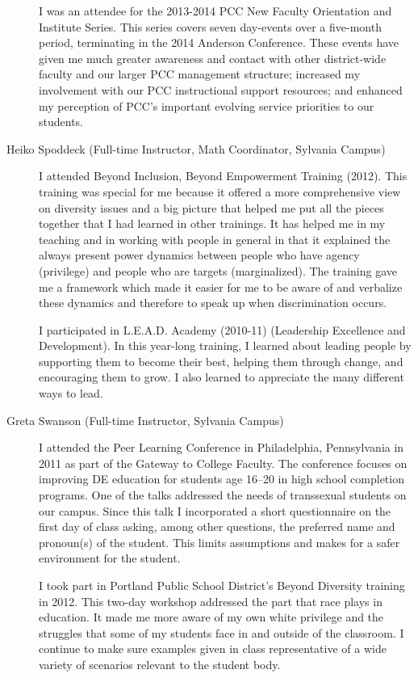 \begin{description}
	I was an attendee for the 2013-2014 PCC New Faculty Orientation and Institute
	Series.  This series covers seven day-events over a five-month period,
	terminating in the 2014 Anderson Conference.  These events have given me much
	greater awareness and contact with other district-wide faculty and our larger
	PCC management structure; increased my involvement with our PCC instructional
	support resources; and enhanced my perception of PCC's important evolving
	service priorities to our students.

	\item[Heiko Spoddeck (Full-time Instructor, Math Coordinator, Sylvania Campus)]
	I attended Beyond Inclusion, Beyond Empowerment Training (2012).  This training
	was special for me because it offered a more comprehensive view on diversity
	issues and a big picture that helped me put all the pieces together that I had
	learned in other trainings. It has helped me in my teaching and in working with
	people in general in that it explained the always present power dynamics
	between people who have agency (privilege) and people who are targets
	(marginalized). The training gave me a framework which made it easier for me to
	be aware of and verbalize these dynamics and therefore to speak up when
	discrimination occurs.

	I participated in L.E.A.D. Academy (2010-11) (Leadership Excellence and
	Development).  In this year-long training, I learned about leading people by
	supporting them to become their best, helping them through change, and
	encouraging them to grow. I also learned to appreciate the many different ways
	to lead.

	\item[Greta Swanson (Full-time Instructor, Sylvania Campus)]
	I attended the Peer Learning Conference in Philadelphia, Pennsylvania in 2011
	as part of the Gateway to College Faculty. The conference focuses on improving
	DE education for students age 16--20 in high school completion programs.
	One of the talks addressed the needs of transsexual students on our campus.
	Since this talk I incorporated a short questionnaire on the first day of class
	asking, among other questions, the preferred name and pronoun(s) of the
	student. This limits assumptions and makes for a safer environment for the
	student.

	I took part in Portland Public School District's Beyond Diversity training
	in 2012. This two-day workshop addressed the part that race plays in education.
	It made me more aware of my own white privilege and the struggles that some of
	my students face in and outside of the classroom. I continue to make sure
	examples given in class representative of a wide variety of scenarios relevant
	to the student body.


\end{description}
